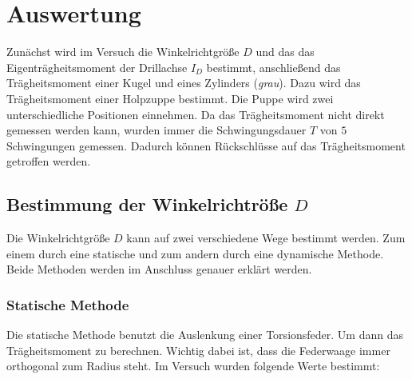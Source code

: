 \section{Auswertung}

Zunächst wird im Versuch die Winkelrichtgröße $D$ und das
das Eigenträgheitsmoment der Drillachse $I_D$ bestimmt, %
anschließend das Trägheitsmoment einer Kugel und eines Zylinders (\emph{grau}).
Dazu wird das Trägheitsmoment einer Holpzuppe bestimmt. 
Die Puppe wird zwei unterschiedliche Positionen einnehmen.%
Da das Trägheitsmoment nicht direkt gemessen werden kann, wurden immer
die Schwingungsdauer $T$ von $5$ Schwingungen gemessen.
Dadurch können Rückschlüsse auf das Trägheitsmoment getroffen werden. %

\subsection{Bestimmung der Winkelrichtröße $D$}

Die Winkelrichtgröße $D$ kann auf zwei verschiedene Wege bestimmt werden.
Zum einem durch eine statische und zum andern durch eine dynamische Methode. %
Beide Methoden werden im Anschluss genauer erklärt werden.

\subsubsection{Statische Methode}

Die statische Methode benutzt die Auslenkung 
einer Torsionsfeder. Um dann das Trägheitsmoment zu berechnen. %
Wichtig dabei ist, dass die Federwaage immer orthogonal zum Radius steht.
Im Versuch wurden folgende Werte bestimmt:


